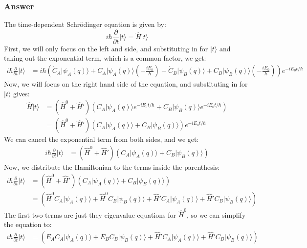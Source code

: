 \documentclass{article}
\begin{document}
\subsubsection{Answer}
The time-dependent Schrödinger equation is given by:
\begin{equation}
    i\hbar \frac{\partial}{\partial t} \lvert t \rangle = \hat{H} \lvert t \rangle
\end{equation}
First, we will only focus on the left and side, and substituting in for \( \lvert t \rangle \) and taking out the exponential term, which is a common factor, we get:
\begin{align}
i\hbar \frac{\partial}{\partial t} \lvert t \rangle &= i\hbar \left( \dot{C}_A \lvert \psi_A(q) \rangle + C_A \lvert \psi_A(q) \rangle \left( -\frac{iE_0}{\hbar} \right) + \dot{C}_B \lvert \psi_B(q) \rangle + C_B \lvert \psi_B(q) \rangle \left( -\frac{iE_0}{\hbar} \right) \right) e^{-iE_0t/\hbar}
\end{align}
Now, we will focus on the right hand side of the equation, and substituting in for \( \lvert t \rangle \) gives:
\begin{align}
\hat{H} \lvert t \rangle &= \left( \hat{H}^0 + \hat{H}' \right) \left( C_A \lvert \psi_A(q) \rangle e^{-iE_0t/\hbar} + C_B \lvert \psi_B(q) \rangle e^{-iE_0t/\hbar} \right) \\
&= \left( \hat{H}^0 + \hat{H}' \right) \left( C_A \lvert \psi_A(q) \rangle + C_B \lvert \psi_B(q) \rangle \right) e^{-iE_0t/\hbar}
\end{align}
We can cancel the exponential term from both sides, and we get:
\begin{align}
i\hbar \frac{\partial}{\partial t} \lvert t \rangle &= \left( \hat{H}^0 + \hat{H}' \right) \left( C_A \lvert \psi_A(q) \rangle + C_B \lvert \psi_B(q) \rangle \right)
\end{align}
Now, we distribute the Hamiltonian to the terms inside the parenthesis:
\begin{align}
i\hbar \frac{\partial}{\partial t} \lvert t \rangle &= \left( \hat{H}^0 + \hat{H}' \right) \left( C_A \lvert \psi_A(q) \rangle + C_B \lvert \psi_B(q) \rangle \right) \\
&= \left( \hat{H}^0 C_A \lvert \psi_A(q) \rangle + \hat{H}^0 C_B \lvert \psi_B(q) \rangle + \hat{H}' C_A \lvert \psi_A(q) \rangle + \hat{H}' C_B \lvert \psi_B(q) \rangle \right)
\end{align}
The first two terms are just they eigenvalue equations for \( \hat{H}^0 \), so we can simplify the equation to:
\begin{align}
i\hbar \frac{\partial}{\partial t} \lvert t \rangle &= \left( E_A C_A \lvert \psi_A(q) \rangle + E_B C_B \lvert \psi_B(q) \rangle + \hat{H}' C_A \lvert \psi_A(q) \rangle + \hat{H}' C_B \lvert \psi_B(q) \rangle \right)
\end{align}
\end{document}
